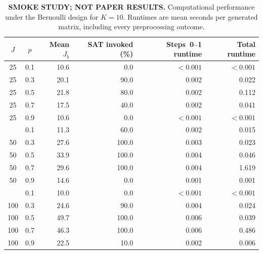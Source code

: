 \begin{table}[htbp]
\centering\small
\begin{tabular}{ccrrrr}
\toprule
\(J\) & \(p\) & Mean \(J_b\) & SAT invoked (\%) & Steps~0--1 runtime & Total runtime\\
\midrule
25 & 0.1 & 10.6 & 0.0 & \(<0.001\) & \(<0.001\)\\
25 & 0.3 & 20.1 & 90.0 & 0.002 & 0.022\\
25 & 0.5 & 21.8 & 80.0 & 0.002 & 0.112\\
25 & 0.7 & 17.5 & 40.0 & 0.002 & 0.041\\
25 & 0.9 & 10.6 & 0.0 & \(<0.001\) & \(<0.001\)\\
\addlinespace
50 & 0.1 & 11.3 & 60.0 & 0.002 & 0.015\\
50 & 0.3 & 27.6 & 100.0 & 0.003 & 0.023\\
50 & 0.5 & 33.9 & 100.0 & 0.004 & 0.046\\
50 & 0.7 & 29.6 & 100.0 & 0.004 & 1.619\\
50 & 0.9 & 14.6 & 0.0 & 0.001 & 0.001\\
\addlinespace
100 & 0.1 & 10.0 & 0.0 & \(<0.001\) & \(<0.001\)\\
100 & 0.3 & 24.6 & 90.0 & 0.004 & 0.024\\
100 & 0.5 & 49.7 & 100.0 & 0.006 & 0.039\\
100 & 0.7 & 46.3 & 100.0 & 0.006 & 0.486\\
100 & 0.9 & 22.5 & 10.0 & 0.002 & 0.006\\
\bottomrule
\end{tabular}
\caption{\textbf{SMOKE STUDY; NOT PAPER RESULTS.} Computational performance under the Bernoulli design for \(K=10\). Runtimes are mean seconds per generated matrix, including every preprocessing outcome.}
\label{tab:bern-computation}
\end{table}
